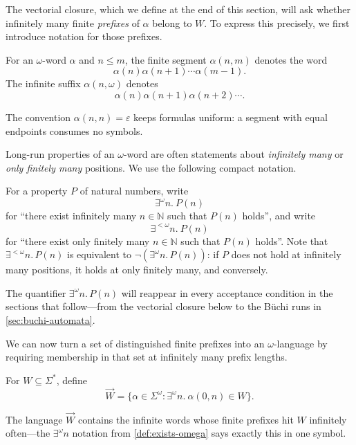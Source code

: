 The vectorial closure, which we define at the end of this section, will
ask whether infinitely many finite \emph{prefixes} of $\alpha$ belong to $W$.
To express this precisely, we first introduce notation for those prefixes.

\begin{definition}
\label{def:omega-segments}
For an $\omega$-word $\alpha$ and $n\leq m$, the finite segment
$\alpha(n,m)$ denotes the word
\[
  \alpha(n)\alpha(n+1)\cdots\alpha(m-1).
\]
The infinite suffix $\alpha(n,\omega)$ denotes
\[
  \alpha(n)\alpha(n+1)\alpha(n+2)\cdots.
\]
\end{definition}

The convention $\alpha(n,n)=\varepsilon$ keeps formulas uniform: a
segment with equal endpoints consumes no symbols.

Long-run properties of an $\omega$-word are often statements about
\emph{infinitely many} or \emph{only finitely many} positions.  We use
the following compact notation.

\begin{definition}
\label{def:exists-omega}
For a property $P$ of natural numbers, write
\[
  \exists^\omega n.\ P(n)
\]
for ``there exist infinitely many $n\in\mathbb{N}$ such that $P(n)$
holds'', and write
\[
  \exists^{<\omega} n.\ P(n)
\]
for ``there exist only finitely many $n\in\mathbb{N}$ such that $P(n)$
holds''.  Note that $\exists^{<\omega}n.\,P(n)$ is equivalent to
$\neg(\exists^\omega n.\,P(n))$: if $P$ does not hold at infinitely many
positions, it holds at only finitely many, and conversely.
\end{definition}

The quantifier $\exists^\omega n.\,P(n)$ will reappear in every acceptance
condition in the sections that follow---from the vectorial closure below to the
B\"uchi runs in \cref{sec:buchi-automata}.

We can now turn a set of distinguished finite prefixes into an
$\omega$-language by requiring membership in that set at infinitely many
prefix lengths.

\begin{definition}
\label{def:vectorial-closure}
For $W\subseteq\Sigma^*$, define
\[
  \overrightarrow{W}=
  \{\alpha\in\Sigma^\omega : \exists^\omega n.\ \alpha(0,n)\in W\}.
\]
\end{definition}

The language $\overrightarrow{W}$ contains the infinite words whose
finite prefixes hit $W$ infinitely often---the $\exists^\omega n$
notation from \cref{def:exists-omega} says exactly this in one symbol.

